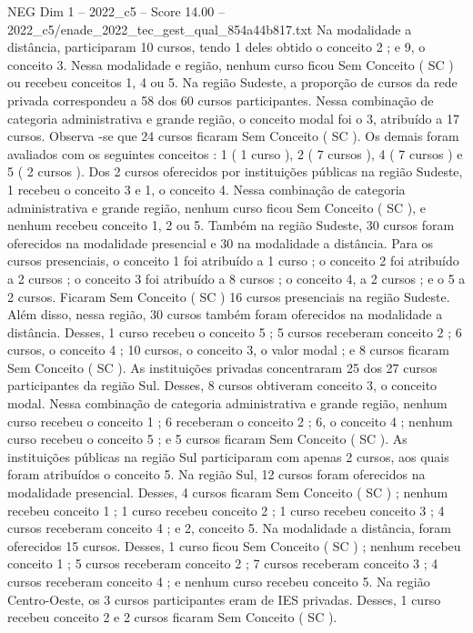 \begin{textsample}{NEG Dim 1 – 2022\_c5 – Score 14.00 – 2022\_c5/enade\_2022\_tec\_gest\_qual\_854a44b817.txt}
Na modalidade a distância, participaram 10 cursos, tendo 1 deles obtido o conceito 2 ; e 9, o conceito 3.
Nessa modalidade e região, nenhum curso ficou Sem Conceito ( SC ) ou recebeu conceitos 1, 4 ou 5.
Na região Sudeste, a proporção de cursos da rede privada correspondeu a 58 dos 60 cursos participantes.
Nessa combinação de categoria administrativa e grande região, o conceito modal foi o 3, atribuído a 17 cursos.
Observa -se que 24 cursos ficaram Sem Conceito ( SC ).
Os demais foram avaliados com os seguintes conceitos : 1 ( 1 curso ), 2 ( 7 cursos ), 4 ( 7 cursos ) e 5 ( 2 cursos ).
Dos 2 cursos oferecidos por instituições públicas na região Sudeste, 1 recebeu o conceito 3 e 1, o conceito 4.
Nessa combinação de categoria administrativa e grande região, nenhum curso ficou Sem Conceito ( SC ), e nenhum recebeu conceito 1, 2 ou 5.
Também na região Sudeste, 30 cursos foram oferecidos na modalidade presencial e 30 na modalidade a distância.
Para os cursos presenciais, o conceito 1 foi atribuído a 1 curso ; o conceito 2 foi atribuído a 2 cursos ; o conceito 3 foi atribuído a 8 cursos ; o conceito 4, a 2 cursos ; e o 5 a 2 cursos.
Ficaram Sem Conceito ( SC ) 16 cursos presenciais na região Sudeste.
Além disso, nessa região, 30 cursos também foram oferecidos na modalidade a distância.
Desses, 1 curso recebeu o conceito 5 ; 5 cursos receberam conceito 2 ; 6 cursos, o conceito 4 ; 10 cursos, o conceito 3, o valor modal ; e 8 cursos ficaram Sem Conceito ( SC ).
As instituições privadas concentraram 25 dos 27 cursos participantes da região Sul.
Desses, 8 cursos obtiveram conceito 3, o conceito modal.
Nessa combinação de categoria administrativa e grande região, nenhum curso recebeu o conceito 1 ; 6 receberam o conceito 2 ; 6, o conceito 4 ; nenhum curso recebeu o conceito 5 ; e 5 cursos ficaram Sem Conceito ( SC ).
As instituições públicas na região Sul participaram com apenas 2 cursos, aos quais foram atribuídos o conceito 5.
Na região Sul, 12 cursos foram oferecidos na modalidade presencial.
Desses, 4 cursos ficaram Sem Conceito ( SC ) ; nenhum recebeu conceito 1 ; 1 curso recebeu conceito 2 ; 1 curso recebeu conceito 3 ; 4 cursos receberam conceito 4 ; e 2, conceito 5.
Na modalidade a distância, foram oferecidos 15 cursos.
Desses, 1 curso ficou Sem Conceito ( SC ) ; nenhum recebeu conceito 1 ; 5 cursos receberam conceito 2 ; 7 cursos receberam conceito 3 ; 4 cursos receberam conceito 4 ; e nenhum curso recebeu conceito 5.
Na região Centro-Oeste, os 3 cursos participantes eram de IES privadas.
Desses, 1 curso recebeu conceito 2 e 2 cursos ficaram Sem Conceito ( SC ).

\end{textsample}
